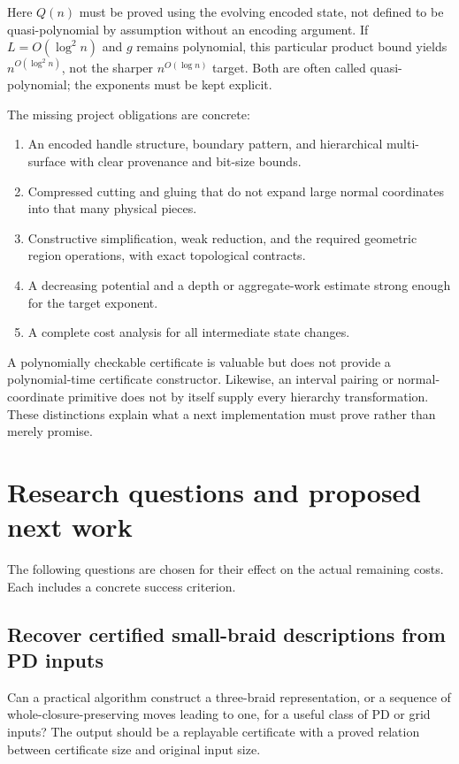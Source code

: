 \documentclass[11pt,letterpaper]{article}
\theoremstyle{definition}
\begin{document}
Here \(Q(n)\) must be proved using the evolving encoded state, not
defined to be quasi-polynomial by assumption without an encoding
argument. If \(L=O(\log^2 n)\) and \(g\) remains polynomial, this
particular product bound yields \(n^{O(\log^2 n)}\), not the sharper
\(n^{O(\log n)}\) target. Both are often called quasi-polynomial;
the exponents must be kept explicit.

The missing project obligations are concrete:
\begin{enumerate}
\item An encoded handle structure, boundary pattern, and hierarchical
multi-surface with clear provenance and bit-size bounds.
\item Compressed cutting and gluing that do not expand large normal
coordinates into that many physical pieces.
\item Constructive simplification, weak reduction, and the required
geometric region operations, with exact topological contracts.
\item A decreasing potential and a depth or aggregate-work estimate
strong enough for the target exponent.
\item A complete cost analysis for all intermediate state changes.
\end{enumerate}

A polynomially checkable certificate is valuable but does not provide
a polynomial-time certificate constructor. Likewise, an interval
pairing or normal-coordinate primitive does not by itself supply every
hierarchy transformation. These distinctions explain what a next
implementation must prove rather than merely promise.

\section{Research questions and proposed next work}
\label{sec:future}

The following questions are chosen for their effect on the actual
remaining costs. Each includes a concrete success criterion.

\subsection{Recover certified small-braid descriptions from PD inputs}

Can a practical algorithm construct a three-braid representation, or a
sequence of whole-closure-preserving moves leading to one, for a useful
class of PD or grid inputs? The output should be a replayable certificate
with a proved relation between certificate size and original input size.
\end{document}
